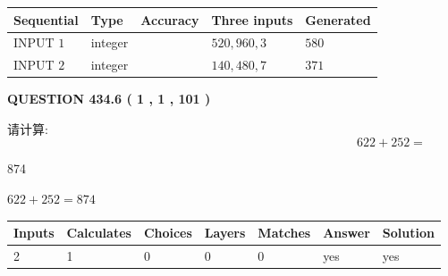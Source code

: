 \documentclass{ctexart}
\begin{document}
   
  
  
\noindent\begin{tabular}{|l|l|l|l|l|}
\hline
 Sequential & Type & Accuracy & Three inputs & Generated \\ 
\hline
 
 
  INPUT $  1 $ & integer &  & $
 520
 , 
 960
 , 
 3
 $ & $ 580 $ 
 \\  \hline  
 
 
  INPUT $  2 $ & integer &  & $
 140
 , 
 480
 , 
 7
 $ & $ 371 $ 
 \\  \hline  
 \end{tabular}
   
   
  
\vspace{0.2in}
  
{\textbf{\Large{QUESTION
434.6 
 ( 1 , 1 , 101 )
}}}
  
  
 
请计算:
\begin{equation}
622 +  %
252 = \nonumber
\end{equation}
 
 
 
\noindent{}
 
 

874
 
 
\noindent{}
 
 

 
 
 
\noindent{}
 
 

$ %
622 +  %
252=   %
874$
 
 
\noindent{}
 
 

 
   
   
   
   
\noindent\begin{tabular}{|l|l|l|l|l|l|l|}
 \hline
Inputs & Calculates & Choices & Layers & Matches & Answer & Solution \\ \hline
 2  & 
 1  & 
 0
  & 
 0  & 
 0  & 
  yes & 
  yes 
  \\ \hline
 \end{tabular}
   
\end{document}
